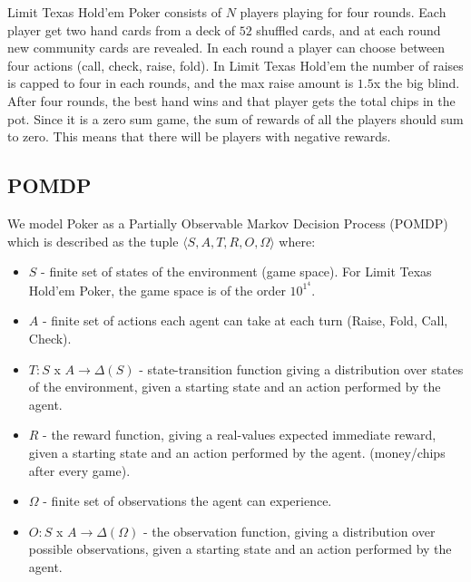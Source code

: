 \documentclass{article}
\begin{document}
Limit Texas Hold'em Poker consists of $N$ players playing for four rounds. Each player get two hand cards from a deck of $52$ shuffled cards, and at each round new community cards are revealed. In each round a player can choose between four actions (call, check, raise, fold). In Limit Texas Hold'em the number of raises is capped to four in each rounds, and the max raise amount is $1.5$x the big blind. After four rounds, the best hand wins and that player gets the total chips in the pot. Since it is a zero sum game, the sum of rewards of all the players should sum to zero. This means that there will be players with negative rewards.



\subsection{POMDP} %

We model Poker as a Partially Observable Markov Decision Process (POMDP) which is described as the tuple $\langle S, A, T, R, O, \Omega \rangle$ where:
\begin{itemize}
    \setlength{\itemsep}{0pt}
    \item $S$ - finite set of states of the environment (game space). For Limit Texas Hold'em Poker, the game space is of the order $10^1^4$.
    
    \item $A$ - finite set of actions each agent can take at each turn (Raise, Fold, Call, Check).
    
    \item $T: S$ x $A \rightarrow \Delta(S)$ - state-transition function giving a distribution over states of the environment, given a starting state and an action performed by the agent.
    
    \item $R$ -  the reward function, giving a real-values expected immediate reward, given a starting state and an action performed by the agent. (money/chips after every game).
    
    \item $\Omega$ - finite set of observations the agent can experience.
    
    \item $O: S$ x $ A \rightarrow \Delta(\Omega)$ -  the observation function, giving a distribution over possible observations, given a starting state and an action performed by the agent.
\end{itemize}
\end{document}
